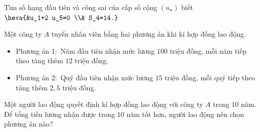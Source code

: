\begin{bt}%
	Tìm số hạng đầu tiên và công sai của cấp số cộng $\left(u_n\right)$ biết $\heva{&u_1+2 u_5=0 \\& S_4=14.}$
\end{bt}

\begin{bt}%
	Một công ty $A$ tuyển nhân viên bằng hai phương án khi kí hợp đồng lao động.
	\begin{itemize}
		\item Phương án $1\colon $ Năm đầu tiên nhận mức lương $100$ triệu đồng, mỗi năm tiếp theo tăng thêm $12$ triệu đồng.
		\item Phương án $2\colon$ Quý đầu tiên nhận mức lương $15$ triệu đồng, mỗi quý tiếp theo tăng thêm $2{,}5$ triệu đồng.
	\end{itemize}
	Một người lao động quyết định kí hợp đồng lao động với công ty $A$ trong $10$ năm. Để tổng tiền lương nhận được trong $10$ năm tốt hơn, người lao động nên chọn phương án nào?
\end{bt}

